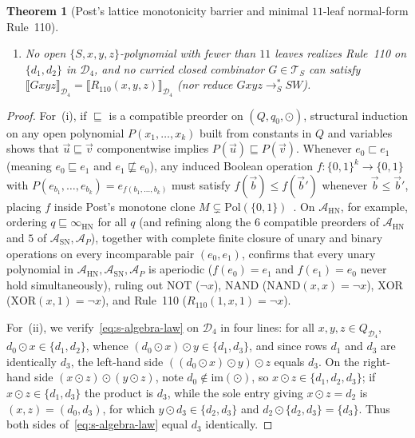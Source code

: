 \documentclass[11pt,reqno]{amsart}
\numberwithin{equation}{section}
\theoremstyle{plain}
\newtheorem{theorem}{Theorem}[section]
\theoremstyle{definition}
\theoremstyle{remark}
\begin{document}
\begin{theorem}[Post's lattice monotonicity barrier and minimal $11$-leaf normal-form Rule~110]
\begin{enumerate}[label=(\roman*)]
\begin{enumerate}
\item[(b)] No open $\{S, x, y, z\}$-polynomial with fewer than $11$ leaves realizes Rule~110 on $\{d_1, d_2\}$ in $\mathcal{D}_4$, and no curried closed combinator $G \in \mathcal{T}_S$ can satisfy $\llbracket G x y z \rrbracket_{\mathcal{D}_4} = \llbracket R_{110}(x, y, z) \rrbracket_{\mathcal{D}_4}$ (nor reduce $G x y z \to_S^* S W$).
\end{enumerate}
\end{enumerate}
\end{theorem}

\begin{proof}
For~(i), if $\sqsubseteq$ is a compatible preorder on $(Q, q_0, \odot)$, structural induction on any open polynomial $P(x_1, \dots, x_k)$ built from constants in $Q$ and variables shows that $\vec{u} \sqsubseteq \vec{v}$ componentwise implies $P(\vec{u}) \sqsubseteq P(\vec{v})$. Whenever $e_0 \sqsubset e_1$ (meaning $e_0 \sqsubseteq e_1$ and $e_1 \not\sqsubseteq e_0$), any induced Boolean operation $f : \{0, 1\}^k \to \{0, 1\}$ with $P(e_{b_1}, \dots, e_{b_k}) = e_{f(b_1, \dots, b_k)}$ must satisfy $f(\vec{b}) \le f(\vec{b}')$ whenever $\vec{b} \le \vec{b}'$, placing $f$ inside Post's monotone clone $M \subsetneq \mathrm{Pol}(\{0, 1\})$~\cite{Post1941}. On $\mathcal{A}_{\mathrm{HN}}$, for example, ordering $q \sqsubseteq \infty_{\mathrm{HN}}$ for all $q$ (and refining along the $6$ compatible preorders of $\mathcal{A}_{\mathrm{HN}}$ and $5$ of $\mathcal{A}_{\mathrm{SN}}, \mathcal{A}_P$), together with complete finite closure of unary and binary operations on every incomparable pair $(e_0, e_1)$, confirms that every unary polynomial in $\mathcal{A}_{\mathrm{HN}}, \mathcal{A}_{\mathrm{SN}}, \mathcal{A}_P$ is aperiodic ($f(e_0) = e_1$ and $f(e_1) = e_0$ never hold simultaneously), ruling out $\mathrm{NOT}$ ($\neg x$), $\mathrm{NAND}$ ($\mathrm{NAND}(x, x) = \neg x$), $\mathrm{XOR}$ ($\mathrm{XOR}(x, 1) = \neg x$), and Rule~110 ($R_{110}(1, x, 1) = \neg x$).

For~(ii), we verify~\eqref{eq:s-algebra-law} on $\mathcal{D}_4$ in four lines: for all $x, y, z \in Q_{\mathcal{D}_4}$, $d_0 \odot x \in \{d_1, d_2\}$, whence $(d_0 \odot x) \odot y \in \{d_1, d_3\}$, and since rows $d_1$ and $d_3$ are identically $d_3$, the left-hand side $((d_0 \odot x) \odot y) \odot z$ equals $d_3$. On the right-hand side $(x \odot z) \odot (y \odot z)$, note $d_0 \notin \mathrm{im}(\odot)$, so $x \odot z \in \{d_1, d_2, d_3\}$; if $x \odot z \in \{d_1, d_3\}$ the product is $d_3$, while the sole entry giving $x \odot z = d_2$ is $(x, z) = (d_0, d_3)$, for which $y \odot d_3 \in \{d_2, d_3\}$ and $d_2 \odot \{d_2, d_3\} = \{d_3\}$. Thus both sides of~\eqref{eq:s-algebra-law} equal $d_3$ identically.


\end{proof}
\end{document}
